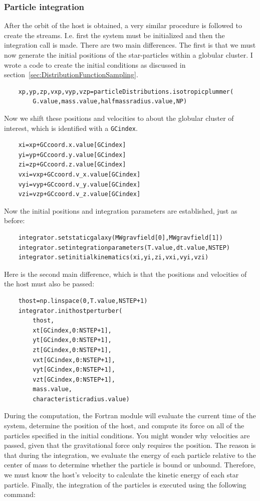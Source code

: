 \subsubsection*{Particle integration}
After the orbit of the host is obtained, a very similar procedure is followed to create the streams. I.e. first the system must be initialized and then the integration call is made. There are two main differences. The first is that we must now generate the initial positions of the star-particles within a globular cluster. I wrote a code to create the initial conditions as discussed in section~\ref{sec:DistributionFunctionSampling}.
\begin{lstlisting}
    xp,yp,zp,vxp,vyp,vzp=particleDistributions.isotropicplummer(
        G.value,mass.value,halfmassradius.value,NP) 
\end{lstlisting}
Now we shift these positions and velocities to about the globular cluster of interest, which is identified with a \texttt{GCindex}.
\begin{lstlisting}
    xi=xp+GCcoord.x.value[GCindex]
    yi=yp+GCcoord.y.value[GCindex]
    zi=zp+GCcoord.z.value[GCindex]
    vxi=vxp+GCcoord.v_x.value[GCindex]
    vyi=vyp+GCcoord.v_y.value[GCindex]
    vzi=vzp+GCcoord.v_z.value[GCindex]
\end{lstlisting}
Now the initial positions and integration parameters are established, just as before:
\begin{lstlisting}
    integrator.setstaticgalaxy(MWgravfield[0],MWgravfield[1])
    integrator.setintegrationparameters(T.value,dt.value,NSTEP)
    integrator.setinitialkinematics(xi,yi,zi,vxi,vyi,vzi)
\end{lstlisting}
Here is the second main difference, which is that the positions and velocities of the host must also be passed:
\begin{lstlisting}
    thost=np.linspace(0,T.value,NSTEP+1)
    integrator.inithostperturber(
        thost,
        xt[GCindex,0:NSTEP+1],
        yt[GCindex,0:NSTEP+1],
        zt[GCindex,0:NSTEP+1],
        vxt[GCindex,0:NSTEP+1],
        vyt[GCindex,0:NSTEP+1],
        vzt[GCindex,0:NSTEP+1],
        mass.value,
        characteristicradius.value)    
\end{lstlisting}
During the computation, the Fortran module will evaluate the current time of the system, determine the position of the host, and compute its force on all of the particles specified in the initial conditions. You might wonder why velocities are passed, given that the gravitational force only requires the position. The reason is that during the integration, we evaluate the energy of each particle relative to the center of mass to determine whether the particle is bound or unbound. Therefore, we must know the host's velocity to calculate the kinetic energy of each star particle. Finally, the integration of the particles is executed using the following command:

